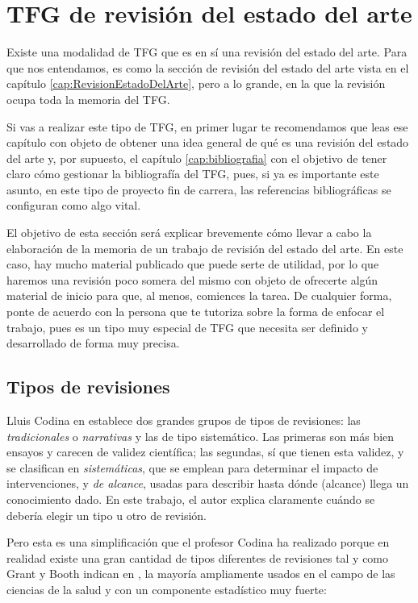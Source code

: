 \section{TFG de revisión del estado del arte}
\label{appendix:revisionestado}

Existe una modalidad de TFG que es en sí una revisión del estado del arte. Para que nos entendamos, es como la sección de revisión del estado del arte vista en el capítulo \ref{cap:RevisionEstadoDelArte}, pero a lo grande, en la que la revisión ocupa toda la memoria del TFG.

Si vas a realizar este tipo de TFG, en primer lugar te recomendamos que leas ese capítulo con objeto de obtener una idea general de qué es una revisión del estado del arte y, por supuesto, el capítulo \ref{cap:bibliografia} con el objetivo de tener claro cómo gestionar la bibliografía del TFG, pues, si ya es importante este asunto, en este tipo de proyecto fin de carrera, las referencias bibliográficas se configuran como algo vital.

El objetivo de esta sección será explicar brevemente cómo llevar a cabo la elaboración de la memoria de un trabajo de revisión del estado del arte. En este caso, hay mucho material publicado que puede serte de utilidad, por lo que haremos una revisión poco somera del mismo con objeto de ofrecerte algún material de inicio para que, al menos, comiences la tarea. De cualquier forma, ponte de acuerdo con la persona que te tutoriza sobre la forma de enfocar el trabajo, pues es un tipo muy especial de TFG que necesita ser definido y desarrollado de forma muy precisa.

\subsection{Tipos de revisiones}

Lluis Codina en \cite{codina2024lluis} establece dos grandes grupos de tipos de revisiones: las \textit{tradicionales} o \textit{narrativas} y las de tipo sistemático. Las primeras son más bien ensayos y carecen de validez científica; las segundas, sí que tienen esta validez, y se clasifican en \textit{sistemáticas}, que se emplean para determinar el impacto de intervenciones, y \textit{de alcance}, usadas para describir hasta dónde (alcance) llega un conocimiento dado. En este trabajo, el autor explica claramente cuándo se debería elegir un tipo u otro de revisión.

Pero esta es una simplificación que el profesor Codina ha realizado porque en realidad existe una gran cantidad de tipos diferentes de revisiones tal y como Grant y Booth indican en \cite{grant2009maria}, la mayoría ampliamente usados en el campo de las ciencias de la salud y con un componente estadístico muy fuerte:


